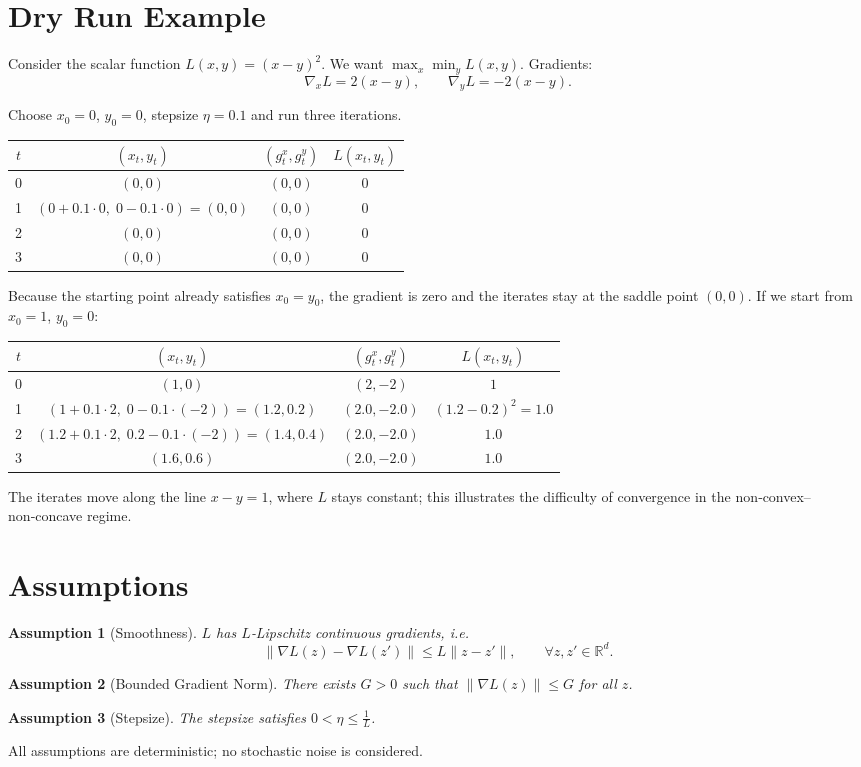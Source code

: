 \documentclass{article}
\newtheorem{assumption}{Assumption}
\begin{document}
\section*{Dry Run Example}
Consider the scalar function $L(x,y)=(x-y)^2$.  
We want $\displaystyle\max_x\min_y L(x,y)$.  
Gradients:
\[
\nabla_x L=2(x-y),\qquad \nabla_y L=-2(x-y).
\]

Choose $x_0=0$, $y_0=0$, stepsize $\eta=0.1$ and run three iterations.

\begin{tabular}{c|c|c|c}
$t$ & $(x_t,y_t)$ & $(g^x_t,g^y_t)$ & $L(x_t,y_t)$\\ \hline
0 & $(0,0)$ & $(0,0)$ & $0$\\
1 & $(0+0.1\cdot0,\;0-0.1\cdot0)=(0,0)$ & $(0,0)$ & $0$\\
2 & $(0,0)$ & $(0,0)$ & $0$\\
3 & $(0,0)$ & $(0,0)$ & $0$
\end{tabular}

Because the starting point already satisfies $x_0=y_0$, the gradient is zero and the iterates stay at the saddle point $(0,0)$.  
If we start from $x_0=1$, $y_0=0$:

\begin{tabular}{c|c|c|c}
$t$ & $(x_t,y_t)$ & $(g^x_t,g^y_t)$ & $L(x_t,y_t)$\\ \hline
0 & $(1,0)$ & $(2, -2)$ & $1$\\
1 & $(1+0.1\cdot2,\;0-0.1\cdot(-2))=(1.2,0.2)$ & $(2.0, -2.0)$ & $(1.2-0.2)^2=1.0$\\
2 & $(1.2+0.1\cdot2,\;0.2-0.1\cdot(-2))=(1.4,0.4)$ & $(2.0,-2.0)$ & $1.0$\\
3 & $(1.6,0.6)$ & $(2.0,-2.0)$ & $1.0$
\end{tabular}
The iterates move along the line $x-y=1$, where $L$ stays constant; this illustrates the difficulty of convergence in the non‑convex–non‑concave regime.

\section*{Assumptions}
\begin{assumption}[Smoothness]\label{as:smooth}
$L$ has $L$‑Lipschitz continuous gradients, i.e.
\[
\|\nabla L(z)-\nabla L(z')\|\le L\|z-z'\|,\qquad\forall z,z'\in\mathbb{R}^{d}.
\]
\end{assumption}
\begin{assumption}[Bounded Gradient Norm]\label{as:bound}
There exists $G>0$ such that $\|\nabla L(z)\|\le G$ for all $z$.
\end{assumption}
\begin{assumption}[Stepsize]\label{as:step}
The stepsize satisfies $0<\eta\le \frac{1}{L}$.
\end{assumption}
All assumptions are deterministic; no stochastic noise is considered.
\end{document}
